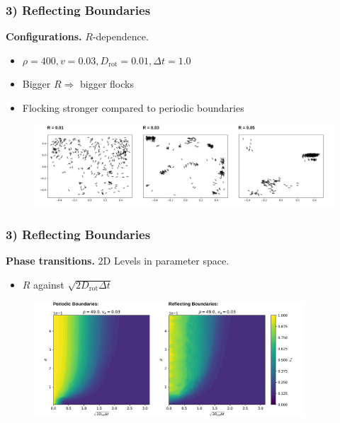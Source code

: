 \begin{frame}
	\frametitle{3) Reflecting Boundaries}
	\textbf{Configurations.} $R$-dependence.
	\begin{itemize}
	    \item $\rho = 400, v = 0.03, D_{\text{rot}} = 0.01, \Delta t = 1.0$
	    \item Bigger $R\Rightarrow$ bigger flocks 
	    \item Flocking stronger compared to periodic boundaries
	\end{itemize}
	\begin{figure}[H]
  		\includegraphics[width=\textwidth]{images/chapter3/N_20_L_1.000000_v_0.030000_R_D_0.010000_rbc.png} 
	\end{figure}
\end{frame}

\begin{frame}
	\frametitle{3) Reflecting Boundaries}
	\textbf{Phase transitions.} 2D Levels in parameter space.
	\begin{itemize}
	    \item $R$ against $\sqrt{2D_{\text{rot}}\Delta t}$
	\end{itemize}
	\begin{figure}[H]
  		\includegraphics[width=0.9\textwidth]{images/chapter3/r_eta_transition_2D_comparison_pbc_rbc.png} 
	\end{figure}
\end{frame}

